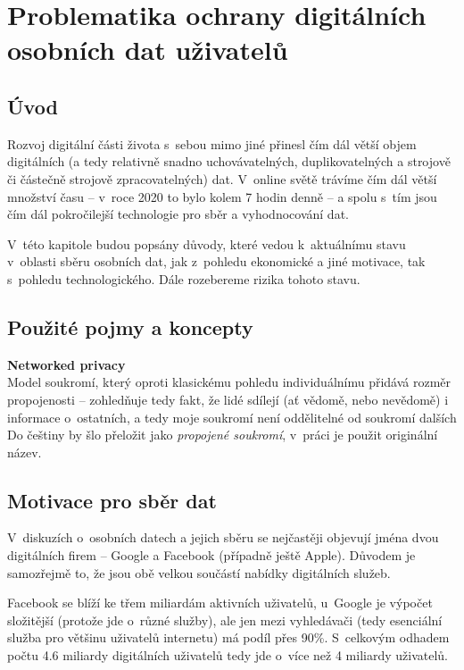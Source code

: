 \chapter{Problematika ochrany digitálních osobních dat uživatelů}

\section*{Úvod}
Rozvoj digitální části života s~sebou mimo jiné přinesl čím dál větší objem digitálních (a tedy relativně snadno uchovávatelných, duplikovatelných a strojově či částečně strojově zpracovatelných) dat. V~online světě trávíme čím dál větší množství času -- v~roce 2020 to bylo kolem 7 hodin denně \citep{digital-2021-report} -- a spolu s~tím jsou čím dál pokročilejší technologie pro sběr a vyhodnocování dat.

V~této kapitole budou popsány důvody, které vedou k~aktuálnímu stavu v~oblasti sběru osobních dat, jak z~pohledu ekonomické a jiné motivace, tak s~pohledu technologického. Dále rozebereme rizika tohoto stavu.

\section{Použité pojmy a koncepty}

\textbf{Networked privacy}\\
Model soukromí, který oproti klasickému pohledu individuálnímu přidává rozměr propojenosti -- zohledňuje tedy fakt, že lidé sdílejí (ať vědomě, nebo nevědomě) i informace o~ostatních, a tedy moje soukromí není oddělitelné od soukromí dalších\citep{networked-privacy}\\
Do češtiny by šlo přeložit jako \textit{propojené soukromí}, v~práci je použit originální název.

\section{Motivace pro sběr dat}

V~diskuzích o~osobních datech a jejich sběru se nejčastěji objevují jména dvou digitálních firem -- Google a Facebook (případně ještě Apple). Důvodem je samozřejmě to, že jsou obě velkou součástí nabídky digitálních služeb.

Facebook se blíží ke třem miliardám aktivních uživatelů\citep{facebook-active-users}, u~Google je výpočet složitější (protože jde o~různé služby), ale jen mezi vyhledávači (tedy esenciální služba pro většinu uživatelů internetu) má podíl přes 90\%\citep{google-search}. S~celkovým odhadem počtu 4.6 miliardy digitálních uživatelů \citep{digital-2021-report} tedy jde o~více než 4 miliardy uživatelů.

